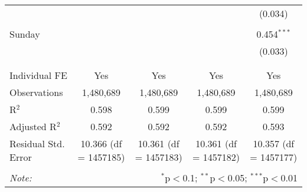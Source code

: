 \documentclass[
]{article}
\begin{document}
\begin{table}[!htbp]
{\begin{tabular}{@{\extracolsep{5pt}}lcccc}
  &  &  &  & (0.034) \\ 
  & & & & \\ 
 Sunday &  &  &  & 0.454$^{***}$ \\ 
  &  &  &  & (0.033) \\ 
  & & & & \\ 
\hline \\[-1.8ex] 
Individual FE & Yes & Yes & Yes & Yes \\ 
Observations & 1,480,689 & 1,480,689 & 1,480,689 & 1,480,689 \\ 
R$^{2}$ & 0.598 & 0.599 & 0.599 & 0.599 \\ 
Adjusted R$^{2}$ & 0.592 & 0.592 & 0.592 & 0.593 \\ 
Residual Std. Error & 10.366 (df = 1457185) & 10.361 (df = 1457183) & 10.361 (df = 1457182) & 10.357 (df = 1457177) \\ 
\hline 
\hline \\[-1.8ex] 
\textit{Note:}  & \multicolumn{4}{r}{$^{*}$p$<$0.1; $^{**}$p$<$0.05; $^{***}$p$<$0.01} \\ 
\end{tabular}
} 
\end{table} 
\newpage
\end{document}
